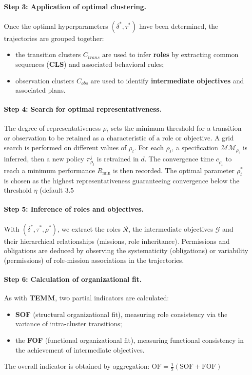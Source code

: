 \documentclass[pdflatex,sn-mathphys-num]{sn-jnl}%
\theoremstyle{thmstyleone}%
\theoremstyle{thmstyletwo}%
\theoremstyle{thmstylethree}%
\begin{document}
\paragraph*{Step 3: Application of optimal clustering.}
Once the optimal hyperparameters $(\delta^*, \tau^*)$ have been determined, the trajectories are grouped together:
\begin{itemize}
    \item the transition clusters $C_{trans}$ are used to infer \textbf{roles} by extracting common sequences (\textbf{CLS}) and associated behavioral rules;
    \item observation clusters $C_{obs}$ are used to identify \textbf{intermediate objectives} and associated plans.
\end{itemize}

\paragraph*{Step 4: Search for optimal representativeness.}
The degree of representativeness $\rho_t$ sets the minimum threshold for a transition or observation to be retained as a characteristic of a role or objective.
A grid search is performed on different values of $\rho_t$.
For each $\rho_t$, a specification $\mathcal{MM}_{\rho_t}$ is inferred, then a new policy $\pi^j_{\rho_t}$ is retrained in $d$.
The convergence time $c_{\rho_t}$ to reach a minimum performance $R_{\min}$ is then recorded.
The optimal parameter $\rho_t^*$ is chosen as the highest representativeness guaranteeing convergence below the threshold $\eta$ (default 3.5%

\paragraph*{Step 5: Inference of roles and objectives. }
With $(\delta^*, \tau^*, \rho^*)$, we extract the roles $\mathcal{R}$, the intermediate objectives $\mathcal{G}$ and their hierarchical relationships (missions, role inheritance).
Permissions and obligations are deduced by observing the systematicity (obligations) or variability (permissions) of role-mission associations in the trajectories.

\paragraph*{Step 6: Calculation of organizational fit.}
As with \textbf{TEMM}, two partial indicators are calculated:
\begin{itemize}
    \item \textbf{\textbf{SOF}} (structural organizational fit), measuring role consistency via the variance of intra-cluster transitions;
    \item the \textbf{\textbf{FOF}} (functional organizational fit), measuring functional consistency in the achievement of intermediate objectives.
\end{itemize}
The overall indicator is obtained by aggregation:
$\text{OF} = \frac{1}{2}(\text{SOF} + \text{FOF})$
\end{document}
